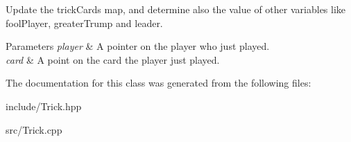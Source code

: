 Update the trick\-Cards map, and determine also the value of other variables like fool\-Player, greater\-Trump and leader. 


\begin{DoxyParams}{Parameters}
{\em player} & A pointer on the player who just played. \\
\hline
{\em card} & A point on the card the player just played. \\
\hline
\end{DoxyParams}


The documentation for this class was generated from the following files\-:\begin{DoxyCompactItemize}
\item 
include/Trick.\-hpp\item 
src/Trick.\-cpp\end{DoxyCompactItemize}
